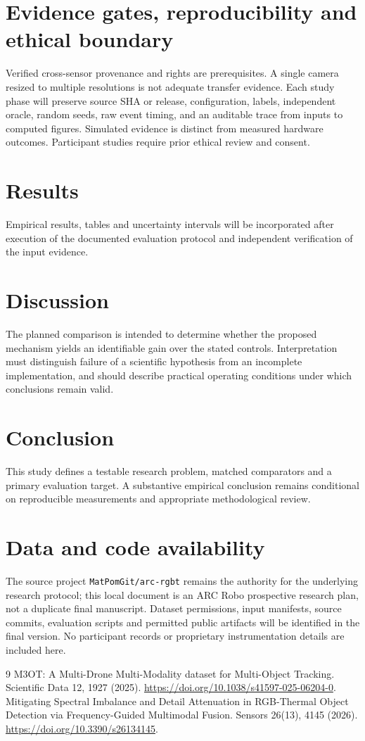 \documentclass[11pt,a4paper]{article}
\begin{document}
\section{Evidence gates, reproducibility and ethical boundary}
Verified cross-sensor provenance and rights are prerequisites. A single camera resized to multiple resolutions is not adequate transfer evidence. Each study phase will preserve source SHA or release, configuration, labels, independent oracle, random seeds, raw event timing, and an auditable trace from inputs to computed figures. Simulated evidence is distinct from measured hardware outcomes. Participant studies require prior ethical review and consent.

\section{Results}
Empirical results, tables and uncertainty intervals will be incorporated after execution of the documented evaluation protocol and independent verification of the input evidence.

\section{Discussion}
The planned comparison is intended to determine whether the proposed mechanism yields an identifiable gain over the stated controls. Interpretation must distinguish failure of a scientific hypothesis from an incomplete implementation, and should describe practical operating conditions under which conclusions remain valid.

\section{Conclusion}
This study defines a testable research problem, matched comparators and a primary evaluation target. A substantive empirical conclusion remains conditional on reproducible measurements and appropriate methodological review.

\section{Data and code availability}
The source project \texttt{MatPomGit/arc-rgbt} remains the authority for the underlying research protocol; this local document is an ARC Robo prospective research plan, not a duplicate final manuscript. Dataset permissions, input manifests, source commits, evaluation scripts and permitted public artifacts will be identified in the final version. No participant records or proprietary instrumentation details are included here.
\begin{thebibliography}{9}
 M3OT: A Multi-Drone Multi-Modality dataset for Multi-Object Tracking. Scientific Data 12, 1927 (2025). \url{https://doi.org/10.1038/s41597-025-06204-0}.
 Mitigating Spectral Imbalance and Detail Attenuation in RGB-Thermal Object Detection via Frequency-Guided Multimodal Fusion. Sensors 26(13), 4145 (2026). \url{https://doi.org/10.3390/s26134145}.
\end{thebibliography}
\end{document}

